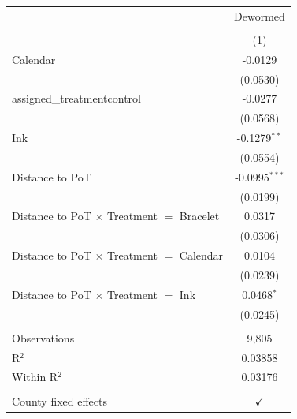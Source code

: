 
\begingroup
\centering
\begin{tabular}{lc}
   \toprule
                                                    & Dewormed\\  
                                                    &  \\   
                                                    & (1)\\  
   \midrule 
   Calendar                                         & -0.0129\\   
                                                    & (0.0530)\\   
   assigned\_treatmentcontrol                       & -0.0277\\   
                                                    & (0.0568)\\   
   Ink                                              & -0.1279$^{**}$\\   
                                                    & (0.0554)\\   
   Distance to PoT                                  & -0.0995$^{***}$\\   
                                                    & (0.0199)\\   
   Distance to PoT $\times$ Treatment $=$ Bracelet  & 0.0317\\   
                                                    & (0.0306)\\   
   Distance to PoT $\times$ Treatment $=$ Calendar  & 0.0104\\   
                                                    & (0.0239)\\   
   Distance to PoT $\times$ Treatment $=$ Ink       & 0.0468$^{*}$\\   
                                                    & (0.0245)\\   
    \\
   Observations                                     & 9,805\\  
   R$^2$                                            & 0.03858\\  
   Within R$^2$                                     & 0.03176\\  
    \\
   County fixed effects                             & $\checkmark$\\   
   \bottomrule
\end{tabular}
\par\endgroup



